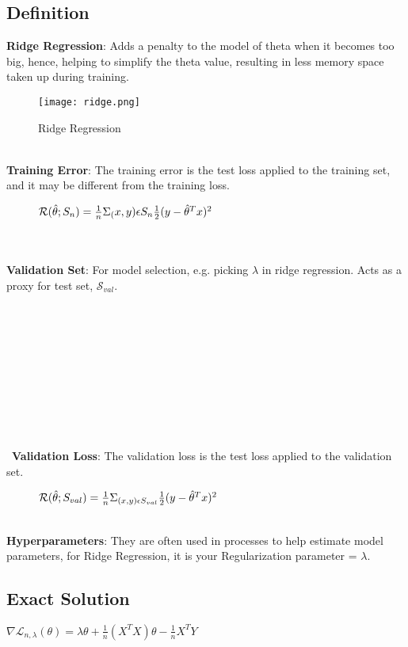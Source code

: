 \documentclass[a4paper]{article}
\begin{document}
\subsection{Definition}
\textbf{Ridge Regression}: Adds a penalty to the model of theta when it becomes too big, hence, helping to simplify the theta value, resulting in less memory space taken up during training.\\
\begin{figure}[h]
    \centering
\texttt{[image: ridge.png]}
    \caption{Ridge Regression}
    \label{fig:my_label}
\end{figure} 
\\\textbf{Training Error}: The training error is the test loss applied to the training set, and it may be different from the training loss.
\begin{figure}[h]
    \centering
$\mathcal{R}(\hat{\theta} ; {S_n}) = \frac{1}{n}{\Sigma_(x,y)\epsilon S_n} \frac{1}{2}(y - \Hat{\theta}^{T}x)^2$
\end{figure} \\ \\
\textbf{Validation Set}: For model selection, e.g. picking $\lambda$ in ridge regression. Acts as a proxy for test set, $\mathcal{S}_{val}$.\\ 
\\\\\\\\\\\\\\\\\\\\\
\textbf{Validation Loss}: The validation loss is the test loss applied to the validation set.\\ \begin{figure}[ht] \centering $\mathcal{R}(\hat{\theta} ; {S_{val}}) = \frac{1}{n}{\Sigma_{(x,y)\epsilon S_{val}}} \frac{1}{2}(y - \Hat{\theta}^{T}x)^2$ \end{figure}\\ 
\textbf{Hyperparameters}: They are often used in processes to help estimate model parameters, for Ridge Regression, it is your Regularization parameter = $\lambda$. 

\subsection{Exact Solution}
$\nabla \mathcal{L}_{n,\lambda}(\theta) = \lambda\theta + \frac{1}{n}(X^T X)\theta - \frac{1}{n}X^T Y$
\end{document}
